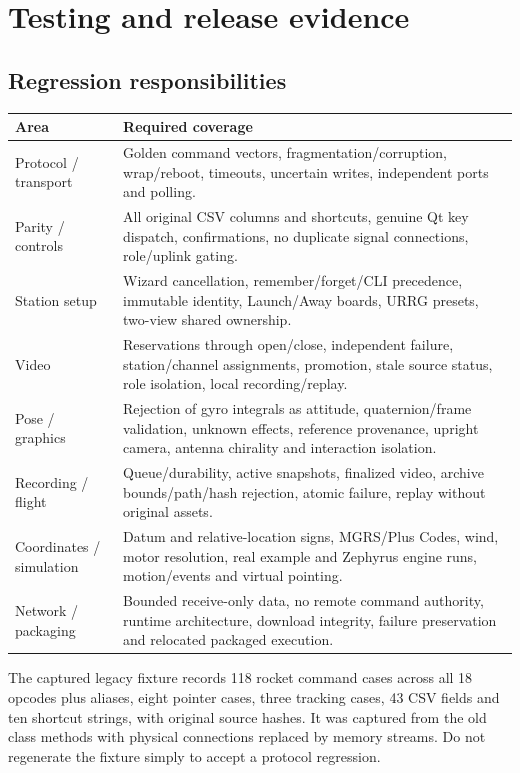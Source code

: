 \section{Testing and release evidence}\label{sec:tests}
\subsection{Regression responsibilities}
\begin{longtable}{@{}L{.31\linewidth}L{.62\linewidth}@{}}
\toprule Area & Required coverage \\\midrule\endhead
Protocol / transport & Golden command vectors, fragmentation/corruption, wrap/reboot, timeouts, uncertain writes, independent ports and polling. \\
Parity / controls & All original CSV columns and shortcuts, genuine Qt key dispatch, confirmations, no duplicate signal connections, role/uplink gating. \\
Station setup & Wizard cancellation, remember/forget/CLI precedence, immutable identity, Launch/Away boards, URRG presets, two-view shared ownership. \\
Video & Reservations through open/close, independent failure, station/channel assignments, promotion, stale source status, role isolation, local recording/replay. \\
Pose / graphics & Rejection of gyro integrals as attitude, quaternion/frame validation, unknown effects, reference provenance, upright camera, antenna chirality and interaction isolation. \\
Recording / flight & Queue/durability, active snapshots, finalized video, archive bounds/path/hash rejection, atomic failure, replay without original assets. \\
Coordinates / simulation & Datum and relative-location signs, MGRS/Plus Codes, wind, motor resolution, real example and Zephyrus engine runs, motion/events and virtual pointing. \\
Network / packaging & Bounded receive-only data, no remote command authority, runtime architecture, download integrity, failure preservation and relocated packaged execution. \\
\bottomrule
\end{longtable}
The captured legacy fixture records 118 rocket command cases across all
18 opcodes plus aliases, eight pointer cases, three tracking cases, 43 CSV
fields and ten shortcut strings, with original source hashes. It was captured
from the old class methods with physical connections replaced by memory streams.
Do not regenerate the fixture simply to accept a protocol regression.

